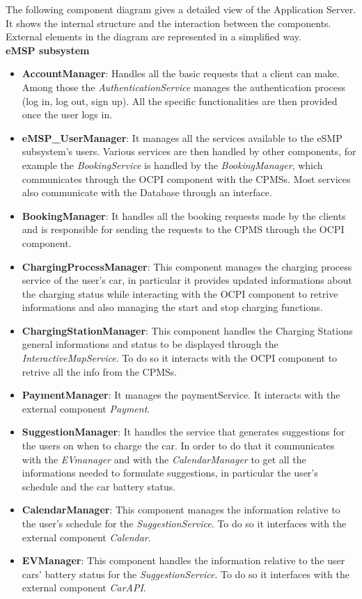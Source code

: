 \documentclass[table, 12pt]{article}
\begin{document}
The following component diagram gives a detailed view of the Application Server. It shows the internal structure and the interaction between the components.
External elements in the diagram are represented in a simplified way.
\\
\textbf{eMSP subsystem}
\begin{itemize}
    \item \textbf{AccountManager}: Handles all the basic requests that a client can make. Among those the \textit{AuthenticationService} manages the authentication process (log in, log out, sign up). All the specific functionalities are then provided once the user logs in.
    \item \textbf{eMSP\_UserManager}: It manages all the services available to the eSMP subsystem's users. Various services are then handled by other components, for example the \textit{BookingService} is handled by the \textit{BookingManager}, which communicates through the OCPI component with the CPMSs. Most services also communicate with the Database through an interface.
    \item \textbf{BookingManager}: It handles all the booking requests made by the clients and is responsible for sending the requests to the CPMS through the OCPI component.
    \item \textbf{ChargingProcessManager}: This component manages the charging process service of the user's car, in particular it provides updated informations about the charging status while interacting with the OCPI component to retrive informations and also managing the start and stop charging functions.
    \item \textbf{ChargingStationManager}: This component  handles the Charging Stations general informations and status to be displayed through the \textit{InteractiveMapService}. To do so it interacts with the OCPI component to retrive all the info from the CPMSs.
    \item \textbf{PaymentManager}: It manages the paymentService. It interacts with the external component \textit{Payment}.
    \item \textbf{SuggestionManager}: It handles the service that generates suggestions for the users on when to charge the car. In order to do that it communicates with the \textit{EVmanager} and with the \textit{CalendarManager} to get all the informations needed to formulate suggestions, in particular the user's schedule and the car battery status.
    \item \textbf{CalendarManager}: This component manages the information relative to the user's schedule for the \textit{SuggestionService}. To do so it interfaces with the external component \textit{Calendar}.
    \item \textbf{EVManager}: This component handles the information relative to the user cars' battery status for the \textit{SuggestionService}. To do so it interfaces with the external component \textit{CarAPI}.
\end{itemize}
\end{document}
